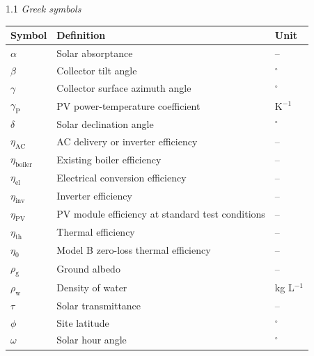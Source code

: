 \documentclass[12pt,letterpaper]{article}
\newcommand{\referenceheading}[1]{\vspace{1.55em}\textit{#1}\par\vspace{0.45em}}
\begin{document}
\begin{spacing}{1.1}
\referenceheading{Greek symbols}
\begin{longtable}{@{}p{2.0cm} p{9.6cm} p{2.3cm}@{}}
\toprule
\textbf{Symbol} & \textbf{Definition} & \textbf{Unit} \\
\midrule
\endhead
$\alpha$ & Solar absorptance & -- \\
$\beta$ & Collector tilt angle & $^\circ$ \\
$\gamma$ & Collector surface azimuth angle & $^\circ$ \\
$\gamma_{\mathrm{P}}$ & PV power-temperature coefficient & K$^{-1}$ \\
$\delta$ & Solar declination angle & $^\circ$ \\
$\eta_{\mathrm{AC}}$ & AC delivery or inverter efficiency & -- \\
$\eta_{\mathrm{boiler}}$ & Existing boiler efficiency & -- \\
$\eta_{\mathrm{el}}$ & Electrical conversion efficiency & -- \\
$\eta_{\mathrm{inv}}$ & Inverter efficiency & -- \\
$\eta_{\mathrm{PV}}$ & PV module efficiency at standard test conditions & -- \\
$\eta_{\mathrm{th}}$ & Thermal efficiency & -- \\
$\eta_0$ & Model B zero-loss thermal efficiency & -- \\
$\rho_{\mathrm{g}}$ & Ground albedo & -- \\
$\rho_{\mathrm{w}}$ & Density of water & kg L$^{-1}$ \\
$\tau$ & Solar transmittance & -- \\
$\phi$ & Site latitude & $^\circ$ \\
$\omega$ & Solar hour angle & $^\circ$ \\
\bottomrule
\end{longtable}


\end{spacing}
\end{document}
